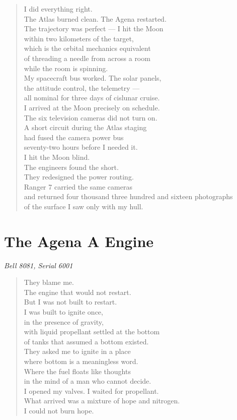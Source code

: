 \documentclass[12pt]{article}
\begin{document}
\begin{verse}
I did everything right.\\
The Atlas burned clean. The Agena restarted.\\
The trajectory was perfect --- I hit the Moon\\
within two kilometers of the target,\\
which is the orbital mechanics equivalent\\
of threading a needle from across a room\\
while the room is spinning.\\
My spacecraft bus worked. The solar panels,\\
the attitude control, the telemetry ---\\
all nominal for three days of cislunar cruise.\\
I arrived at the Moon precisely on schedule.\\
The six television cameras did not turn on.\\
A short circuit during the Atlas staging\\
had fused the camera power bus\\
seventy-two hours before I needed it.\\
I hit the Moon blind.\\
The engineers found the short.\\
They redesigned the power routing.\\
Ranger 7 carried the same cameras\\
and returned four thousand three hundred and sixteen photographs\\
of the surface I saw only with my hull.
\end{verse}

\vspace{1.5em}

\section*{\textcolor{failure}{The Agena A Engine}}
\small\textit{Bell 8081, Serial 6001}

\begin{verse}
They blame me.\\
The engine that would not restart.\\
But I was not built to restart.\\
I was built to ignite once,\\
in the presence of gravity,\\
with liquid propellant settled at the bottom\\
of tanks that assumed a bottom existed.\\
They asked me to ignite in a place\\
where bottom is a meaningless word.\\
Where the fuel floats like thoughts\\
in the mind of a man who cannot decide.\\
I opened my valves. I waited for propellant.\\
What arrived was a mixture of hope and nitrogen.\\
I could not burn hope.
\end{verse}
\end{document}
